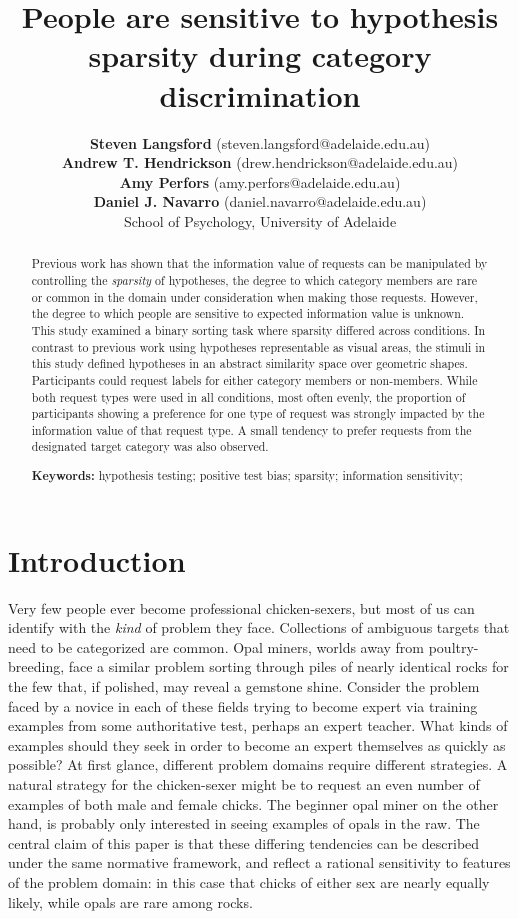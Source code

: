 \documentclass[10pt,letterpaper]{article}
\title{People are sensitive to hypothesis sparsity during category discrimination}
\author{{\bf Steven Langsford} (steven.langsford@adelaide.edu.au) \\
   	{\bf Andrew T. Hendrickson} (drew.hendrickson@adelaide.edu.au) \\
	{\bf Amy Perfors} (amy.perfors@adelaide.edu.au) \\
   	{\bf Daniel J. Navarro} (daniel.navarro@adelaide.edu.au) \\
   School of Psychology, University of Adelaide}
\begin{document}
\maketitle

\begin{abstract}
Previous work has shown that the information value of requests can be manipulated by controlling the \textit{sparsity} of hypotheses, the degree to which category members are rare or common in the domain under consideration when making those requests. However, the degree to which people are sensitive to expected information value is unknown. This study examined a binary sorting task where sparsity differed across conditions. In contrast to previous work using hypotheses representable as visual areas, the stimuli in this study defined hypotheses in an abstract similarity space over geometric shapes. Participants could request labels for either category members or non-members. While both request types were used in all conditions, most often evenly, the proportion of participants showing a preference for one type of request was strongly impacted by the information value of that request type. A small tendency to prefer requests from the designated target category was also observed.

\textbf{Keywords:} 
hypothesis testing; positive test bias; sparsity; information sensitivity;
\end{abstract}


\section*{Introduction}
Very few people ever become professional chicken-sexers, but most of us can identify with the \textit{kind} of problem they face. Collections of ambiguous targets that need to be categorized are common. Opal miners, worlds away from poultry-breeding, face a similar problem sorting through piles of nearly identical rocks for the few that, if polished, may reveal a gemstone shine. Consider the problem faced by a novice in each of these fields trying to become expert via training examples from some authoritative test, perhaps an expert teacher. What kinds of examples should they seek in order to become an expert themselves as quickly as possible? At first glance, different problem domains require different strategies. A natural strategy for the chicken-sexer might be to request an even number of examples of both male and female chicks. The beginner opal miner on the other hand, is probably only interested in seeing examples of opals in the raw. The central claim of this paper is that these differing tendencies can be described under the same normative framework, and reflect a rational sensitivity to features of the problem domain: in this case that chicks of either sex are nearly equally likely, while opals are rare among rocks.
\end{document}
